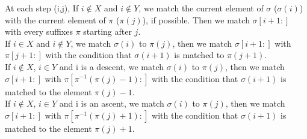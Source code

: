 \documentclass[a4paper]{llncs}
\newcommand{\ptext}{\pi}
\newcommand{\pmotif}{\sigma}
\newcommand{\x}{X}
\newcommand{\y}{Y}
\newcommand{\bmotif}{(\sigma,\x,\y)}
\newcommand{\dstep}{d}
\newcommand{\ustep}{a}
\begin{document}
%						
%							
						
			At each step (i,j),
			If $i \notin \x$ and $i \notin \y$,
			we match the current element of $\pmotif$ ($\pmotif(i)$)
			with the current element of $\ptext$ ($\ptext(j)$), if possible.
			Then we match $\pmotif[i+1:]$ with 
			every suffixes $\ptext$ starting after $j$.\\
			
			If $i \in \x$ and $i \notin \y$,
			we match $\pmotif(i)$ to $\ptext(j)$, 
			then we match $\pmotif[i+1:]$ with $\ptext[j+1:]$
			with the condition that
			$\pmotif(i+1)$ is matched to $\ptext(j+1)$.\\
			
			If $i \notin \x$, $i \in \y$ and i is a descent,
			we match $\pmotif(i)$ to $\ptext(j)$, 
			then we match $\pmotif[i+1:]$ 
			with $\ptext[\ptext^{-1}(\ptext(j)-1):]$
			with the condition that
			$\pmotif(i+1)$ is matched to the element $\ptext(j)-1$.\\						
			
			If $i \notin \x$, $i \in \y$ and i is an ascent,
			we match $\pmotif(i)$ to $\ptext(j)$, 
			then we match $\pmotif[i+1:]$ 
			with $\ptext[\ptext^{-1}(\ptext(j)+1):]$
			with the condition that
			$\pmotif(i+1)$ is matched to the element $\ptext(j)+1$.\\	
\end{document}
